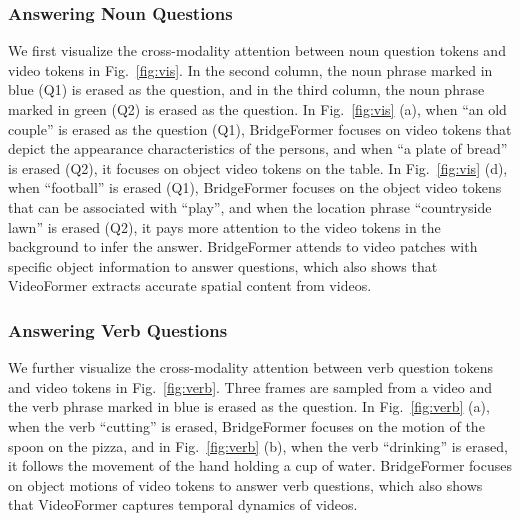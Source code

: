 \documentclass[10pt,twocolumn,letterpaper]{article}
\begin{document}
\subsubsection{Answering Noun Questions}
We first visualize the cross-modality attention between noun question tokens and video tokens in Fig.~\ref{fig:vis}. In the second column, the noun phrase marked in blue (Q1) is erased as the question, and in the third column, the noun phrase marked in green (Q2) is erased as the question. In Fig.~\ref{fig:vis} (a), when ``an old  couple'' is erased as the question (Q1), BridgeFormer focuses on video tokens that depict the appearance characteristics of the persons, and when ``a plate of bread'' is erased (Q2), it focuses on object video tokens on the table. In Fig.~\ref{fig:vis} (d), when ``football'' is erased (Q1), BridgeFormer focuses on the object video tokens that can be associated with ``play'', and when the location phrase ``countryside lawn'' is erased (Q2), it pays more attention to the video tokens in the background to infer the answer. BridgeFormer attends to video patches with specific object information to answer questions, which also shows that VideoFormer extracts accurate spatial content from videos. 

\subsubsection{Answering Verb Questions}
We further visualize the cross-modality attention between verb question tokens and video tokens in Fig.~\ref{fig:verb}. Three frames are sampled from a video and the verb phrase marked in blue is erased as the question. In Fig.~\ref{fig:verb} (a), when the verb ``cutting'' is erased, BridgeFormer focuses on the motion of the spoon on the pizza, and in Fig.~\ref{fig:verb} (b), when the verb ``drinking'' is erased, it follows the movement of the hand holding a cup of water. BridgeFormer focuses on object motions of video tokens to answer verb questions, which also shows that VideoFormer captures temporal dynamics of videos.
\end{document}
